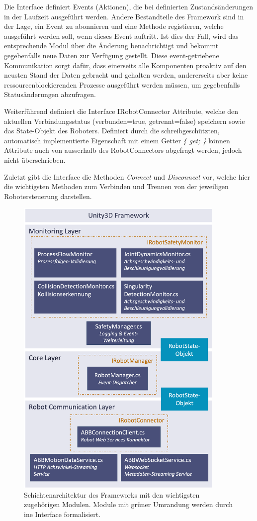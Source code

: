 Die Interface definiert Events (Aktionen), die bei definierten Zustandsänderungen
in der Laufzeit ausgeführt werden. Andere Bestandteile des Framework sind in der
Lage, ein Event zu abonnieren und eine Methode registieren, welche ausgeführt
werden soll, wenn dieses Event auftritt. Ist dies der Fall, wird das
entsprechende Modul über die Änderung benachrichtigt und bekommt gegebenfalls
neue Daten zur Verfügung gestellt. Diese event-getriebene Kommunikation sorgt
dafür, dass einerseits alle Komponenten proaktiv auf den neusten Stand der Daten gebracht
und gehalten werden, andererseits aber keine ressourcenblockierenden Prozesse
ausgeführt werden müssen, um gegebenfalls Statusänderungen abzufragen.

Weiterführend definiert die Interface IRobotConnector Attribute, welche den
aktuellen Verbindungsstatus (verbunden=true, getrennt=false) speichern sowie das
State-Objekt des Roboters. Definiert durch die schreibgeschützten, automatisch
implementierte Eigenschaft mit einem Getter \textit{\{ get; \}} können Attribute
auch von ausserhalb des RobotConnectors abgefragt werden, jedoch nicht
überschrieben.


Zuletzt gibt die Interface die Methoden \textit{Connect} und \textit{Disconnect}
vor, welche hier die wichtigsten Methoden zum Verbinden und
Trennen von der jeweiligen Robotersteuerung darstellen.

\begin{figure}[htbp]
	\centering
	\includegraphics[width=10cm]{Figures/LayerArchitekturFramework.png}
	\caption{Schichtenarchitektur des Frameworks mit den wichtigsten zugehörigen
		Modulen. Module mit grüner Umrandung werden durch ine Interface formalisiert.}
	\label{figure:layer}
\end{figure}

